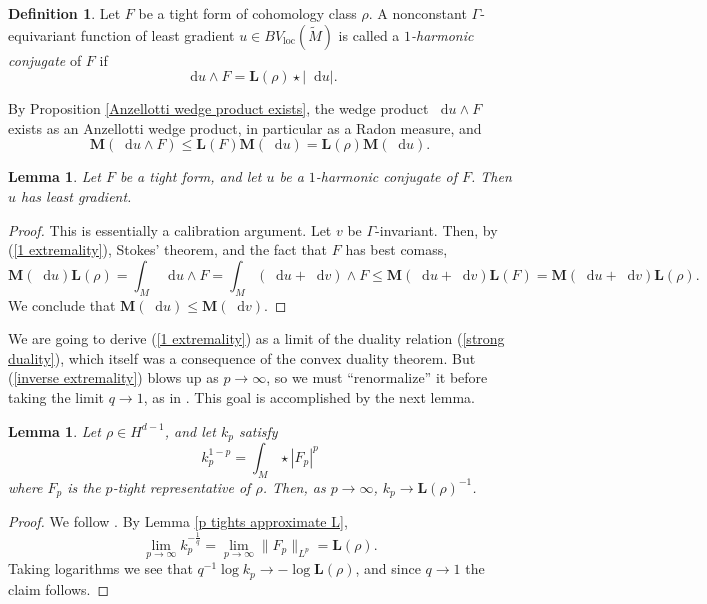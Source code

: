 \documentclass[reqno,11pt]{amsart}
\newcommand*\dif{\mathop{}\!\mathrm{d}}
\newcommand{\Mass}{\mathbf M}
\newcommand{\Comass}{\mathbf L}
\newcommand{\dfn}[1]{\emph{#1}\index{#1}}
\newcommand{\loc}{\mathrm{loc}}
\newtheorem{lemma}[theorem]{Lemma}
\theoremstyle{definition}
\newtheorem{definition}[theorem]{Definition}
\numberwithin{equation}{section}
\begin{document}
\begin{definition}
Let $F$ be a tight form of cohomology class $\rho$.
A nonconstant $\Gamma$-equivariant function of least gradient $u \in BV_\loc(\tilde M)$ is called a \dfn{$1$-harmonic conjugate} of $F$ if
\begin{equation}\label{1 extremality}
\dif u \wedge F = \Comass(\rho) \star |\dif u|.
\end{equation}
\end{definition}

By Proposition \ref{Anzellotti wedge product exists}, the wedge product $\dif u \wedge F$ exists as an Anzellotti wedge product, in particular as a Radon measure, and
$$\Mass(\dif u \wedge F) \leq \Comass(F) \Mass(\dif u) = \Comass(\rho) \Mass(\dif u).$$

\begin{lemma}\label{1 extremality implies least gradient}
Let $F$ be a tight form, and let $u$ be a $1$-harmonic conjugate of $F$.
Then $u$ has least gradient.
\end{lemma}
\begin{proof}
This is essentially a calibration argument.
Let $v$ be $\Gamma$-invariant.
Then, by (\ref{1 extremality}), Stokes' theorem, and the fact that $F$ has best comass,
$$\Mass(\dif u) \Comass(\rho) = \int_M \dif u \wedge F = \int_M (\dif u + \dif v) \wedge F \leq \Mass(\dif u + \dif v) \Comass(F) = \Mass(\dif u + \dif v) \Comass(\rho).$$
We conclude that $\Mass(\dif u) \leq \Mass(\dif v)$.
\end{proof}

We are going to derive (\ref{1 extremality}) as a limit of the duality relation (\ref{strong duality}), which itself was a consequence of the convex duality theorem.
But (\ref{inverse extremality}) blows up as $p \to \infty$, so we must ``renormalize'' it before taking the limit $q \to 1$, as in \cite[\S3.2]{daskalopoulos2020transverse}.
This goal is accomplished by the next lemma.

\begin{lemma}\label{normalizations converge}
Let $\rho \in H^{d - 1}$, and let $k_p$ satisfy 
$$k_p^{1 - p} = \int_M \star |F_p|^p$$
where $F_p$ is the $p$-tight representative of $\rho$.
Then, as $p \to \infty$, $k_p \to \Comass(\rho)^{-1}$.
\end{lemma}
\begin{proof}
We follow \cite[Lemma 3.4]{daskalopoulos2020transverse}.
By Lemma \ref{p tights approximate L},
$$\lim_{p \to \infty} k_p^{-\frac{1}{q}} = \lim_{p \to \infty} \|F_p\|_{L^p} = \Comass(\rho).$$
Taking logarithms we see that $q^{-1} \log k_p \to -\log \Comass(\rho)$, and since $q \to 1$ the claim follows.
\end{proof}
\end{document}

